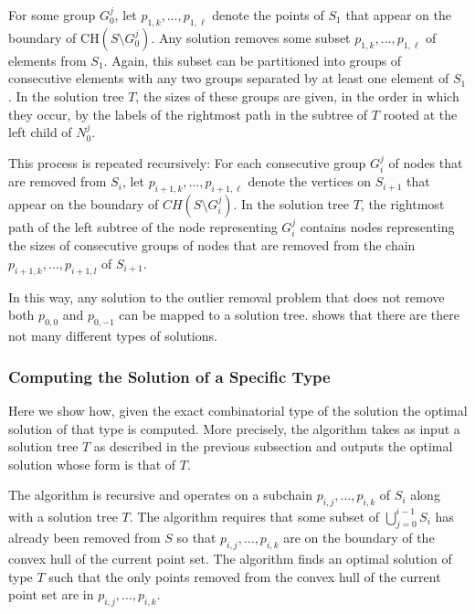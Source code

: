 \documentclass[lotsofwhite]{patmorin}
\newcommand{\ch}{\mathrm{CH}}
\begin{document}
For some group $G_0^j$, let $p_{1,k}, \ldots, p_{1,\ell}$ denote the
points of $S_1$ that appear on the boundary of $\ch(S\setminus
G_0^j)$.  Any solution removes some subset $p_{1,k},\ldots,
p_{1,\ell}$ of elements from $S_1$.  Again, this subset can be
partitioned into groups of consecutive elements with any two groups
separated by at least one element of $S_1$.  In the solution tree $T$,
the sizes of these groups are given, in the order in which they occur,
by the labels of the rightmost path in the subtree of $T$ rooted at
the left child of $N_0^j$.

This process is repeated recursively: For each consecutive group
$G_i^j$ of nodes that are removed from $S_i$, let $p_{i+1,k}, \ldots,
p_{i+1,\ell}$ denote the vertices on $S_{i+1}$ that appear on the
boundary of $CH(S \setminus G_i^j)$. In the solution tree $T$, the
rightmost path of the left subtree of the node representing $G_i^j$
contains nodes representing the sizes of consecutive groups of nodes
that are removed from the chain $p_{i+1,k}, \ldots, p_{i+1,l}$ of
$S_{i+1}$.


In this way, any solution to the outlier removal problem that does not
remove both $p_{0,0}$ and $p_{0,-1}$ can be mapped to a solution tree.
 shows that there are there not many different
types of solutions.



\subsubsection{Computing the Solution of a Specific Type}

Here we show how, given the exact combinatorial type of the solution
the optimal solution of that type is computed. More precisely, the
algorithm takes as input a solution tree $T$ as described in the
previous subsection and outputs the optimal solution whose form is
that of $T$.

The algorithm is recursive and operates on a subchain
$p_{i,j},\ldots,p_{i,k}$ of $S_i$ along with a solution tree $T$.  The
algorithm requires that some subset of $\bigcup_{j=0}^{i-1}S_i$ has
already been removed from $S$ so that $p_{i,j},\ldots,p_{i,k}$ are on
the boundary of the convex hull of the current point set.  The
algorithm finds an optimal solution of type $T$ such that the only
points removed from the convex hull of the current point set are in
$p_{i,j},\ldots,p_{i,k}$.
\end{document}
